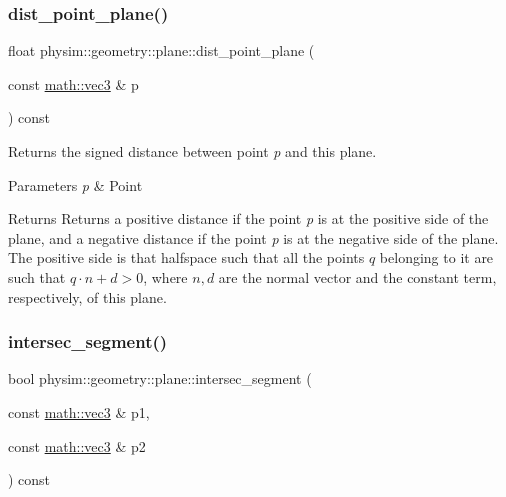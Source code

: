 \subsubsection{\texorpdfstring{dist\+\_\+point\+\_\+plane()}{dist\_point\_plane()}}
{\footnotesize\ttfamily float physim\+::geometry\+::plane\+::dist\+\_\+point\+\_\+plane (\begin{DoxyParamCaption}\item[{const \hyperlink{structphysim_1_1math_1_1vec3}{math\+::vec3} \&}]{p }\end{DoxyParamCaption}) const}



Returns the signed distance between point {\itshape p} and this plane. 


\begin{DoxyParams}{Parameters}
{\em p} & Point \\
\hline
\end{DoxyParams}
\begin{DoxyReturn}{Returns}
Returns a positive distance if the point {\itshape p} is at the \textquotesingle{}positive\textquotesingle{} side of the plane, and a negative distance if the point {\itshape p} is at the \textquotesingle{}negative\textquotesingle{} side of the plane.~\newline
The positive side is that halfspace such that all the points $q$ belonging to it are such that $ q\cdot n + d > 0$, where $n,d$ are the normal vector and the constant term, respectively, of this plane. 
\end{DoxyReturn}
\mbox{\label{classphysim_1_1geometry_1_1plane_a752f1e6507b64a61f20c63f1d49163d8}} 
\subsubsection{\texorpdfstring{intersec\+\_\+segment()}{intersec\_segment()}\hspace{0.1cm}{\footnotesize\ttfamily [1/2]}}
{\footnotesize\ttfamily bool physim\+::geometry\+::plane\+::intersec\+\_\+segment (\begin{DoxyParamCaption}\item[{const \hyperlink{structphysim_1_1math_1_1vec3}{math\+::vec3} \&}]{p1,  }\item[{const \hyperlink{structphysim_1_1math_1_1vec3}{math\+::vec3} \&}]{p2 }\end{DoxyParamCaption}) const\hspace{0.3cm}{\ttfamily [virtual]}}



